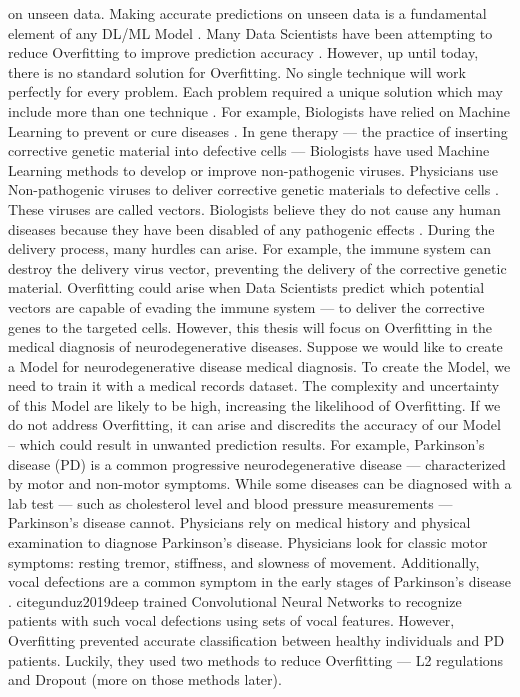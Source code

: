 \documentclass[oneside,12pt,article]{article}
\begin{document}
on unseen data. Making accurate predictions on unseen data is a fundamental element of any DL/ML Model \cite{lawrence2000overfitting}. Many Data Scientists have been attempting to reduce Overfitting to improve prediction accuracy \cite{Xu2019OverfittingRB} \cite{krizhevsky2012imagenet}. However, up until today, there is no standard solution for Overfitting. No single technique will work perfectly for every problem. Each problem required a unique solution which may include more than one technique \cite{moradi2020survey}. For example, Biologists have relied on Machine Learning to prevent or cure diseases \cite{huang2021machine}. In gene therapy — the practice of inserting corrective genetic material into defective cells — Biologists have used Machine Learning methods to develop or improve non-pathogenic viruses. Physicians use Non-pathogenic viruses to deliver corrective genetic materials to defective cells \cite{verma2000gene}. These viruses are called vectors. Biologists believe they do not cause any human diseases because they have been disabled of any pathogenic effects \cite{wang2019adeno}. During the delivery process, many hurdles can arise. For example, the immune system can destroy the delivery virus vector, preventing the delivery of the corrective genetic material. Overfitting could arise when Data Scientists predict which potential vectors are capable of evading the immune system — to deliver the corrective genes to the targeted cells. However, this thesis will focus on Overfitting in the medical diagnosis of neurodegenerative diseases. Suppose we would like to create a Model for neurodegenerative disease medical diagnosis. To create the Model, we need to train it with a medical records dataset. The complexity and uncertainty of this Model are likely to be high, increasing the likelihood of Overfitting. If we do not address Overfitting, it can arise and discredits the accuracy of our Model – which could result in unwanted prediction results. For example, Parkinson's disease (PD) is a common progressive neurodegenerative disease — characterized by motor and non-motor symptoms. While some diseases can be diagnosed with a lab test — such as cholesterol level and blood pressure measurements — Parkinson's disease cannot. Physicians rely on medical history and physical examination to diagnose Parkinson's disease. Physicians look for classic motor symptoms: resting tremor, stiffness, and slowness of movement. Additionally, vocal defections are a common symptom in the early stages of Parkinson's disease \cite{beitz2014parkinson}. cite{gunduz2019deep} trained Convolutional Neural Networks to recognize patients with such vocal defections using sets of vocal features. However, Overfitting prevented accurate classification between healthy individuals and PD patients. Luckily, they used two methods to reduce Overfitting — L2 regulations and Dropout (more on those methods later).
\end{document}
